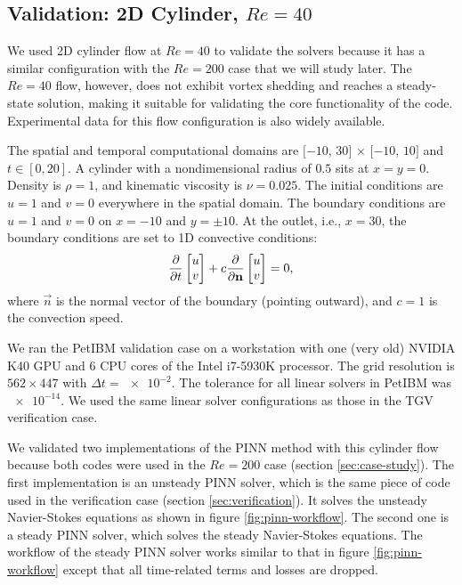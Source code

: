 
\subsection{Validation: 2D Cylinder, $Re=\num{40}$}\label{sec:val_2d_cylinder_re40}

We used 2D cylinder flow at $Re=40$ to validate the solvers because it has a similar configuration with the $Re=200$ case that we will study later.
The $Re=40$ flow, however, does not exhibit vortex shedding and reaches a steady-state solution, making it suitable for validating the core functionality of the code.
Experimental data for this flow configuration is also widely available.

The spatial and temporal computational domains are $[-10$, $30]$ $\times$ $[-10$, $10]$ and $t \in [0, 20]$.
A cylinder with a nondimensional radius of $0.5$ sits at $x=y=0$.
Density is $\rho=1$, and kinematic viscosity is $\nu=0.025$.
The initial conditions are $u=1$ and $v=0$ everywhere in the spatial domain.
The boundary conditions are $u=1$ and $v=0$ on $x=-10$ and $y=\pm 10$.
At the outlet, i.e., $x=30$, the boundary conditions are set to 1D convective conditions:
\begin{equation}\label{eq:convec-bc}
    \frac{\partial }{\partial t}\begin{bmatrix} u \\ v \end{bmatrix}
    +
    c\frac{\partial }{\partial \mathbf{n}}\begin{bmatrix} u \\ v \end{bmatrix} = 0,
\end{equation}
where $\vec{n}$ is the normal vector of the boundary (pointing outward), and $c=1$ is the convection speed.

We ran the PetIBM validation case on a workstation with one (very old) NVIDIA K40 GPU and 6 CPU cores of the Intel i7-5930K processor.
The grid resolution is $562 \times 447$ with $\Delta t=\num{e-2}$.
The tolerance for all linear solvers in PetIBM was $\num{e-14}$.
We used the same linear solver configurations as those in the TGV verification case.

We validated two implementations of the PINN method with this cylinder flow because both codes were used in the $Re=200$ case (section \ref{sec:case-study}).
The first implementation is an unsteady PINN solver, which is the same piece of code used in the verification case (section \ref{sec:verification}).
It solves the unsteady Navier-Stokes equations as shown in figure \ref{fig:pinn-workflow}.
The second one is a steady PINN solver, which solves the steady Navier-Stokes equations.
The workflow of the steady PINN solver works similar to that in figure \ref{fig:pinn-workflow} except that all time-related terms and losses are dropped.

